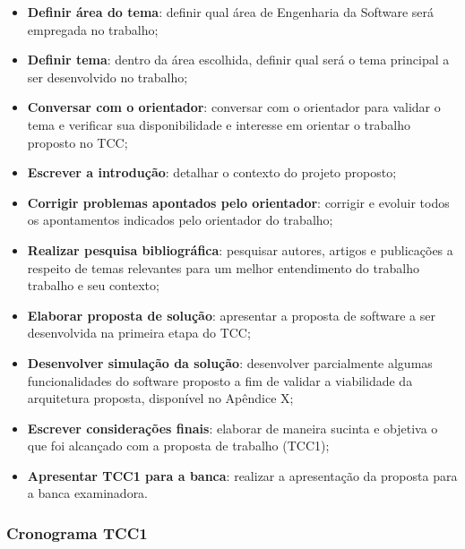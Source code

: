 \begin{itemize}

\item \textbf{Definir área do tema}: definir qual área de Engenharia da Software será empregada no trabalho;

\item \textbf{Definir tema}: dentro da área escolhida, definir qual será o tema principal a ser desenvolvido no trabalho;

\item \textbf{Conversar com o orientador}: conversar com o orientador para validar o tema e verificar sua disponibilidade e interesse em orientar o trabalho proposto no TCC;

\item \textbf{Escrever a introdução}: detalhar o contexto do projeto proposto;

\item \textbf{Corrigir problemas apontados pelo orientador}: corrigir e evoluir todos os apontamentos indicados pelo orientador do trabalho;

\item \textbf{Realizar pesquisa bibliográfica}: pesquisar autores, artigos e publicações a respeito de temas relevantes para um melhor entendimento do trabalho trabalho e seu contexto;

\item \textbf{Elaborar proposta de solução}: apresentar a proposta de software a ser desenvolvida na primeira etapa do TCC;

\item \textbf{Desenvolver simulação da solução}: desenvolver parcialmente algumas funcionalidades do software proposto a fim de validar a viabilidade da arquitetura proposta, disponível no Apêndice X;

\item \textbf{Escrever considerações finais}: elaborar de maneira sucinta e objetiva o que foi alcançado com a proposta de trabalho (TCC1);

\item \textbf{Apresentar TCC1 para a banca}: realizar a apresentação da proposta para a banca examinadora.

\end{itemize}

\newpage

\subsubsection[Cronograma TCC1]{Cronograma TCC1}


